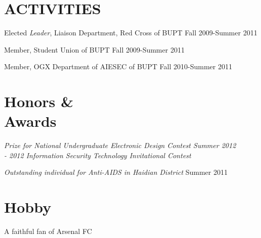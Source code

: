 \documentclass[margin]{res}
\begin{document}
\begin{resume}
    
                                                       
        
\section{ACTIVITIES}             
        Elected {\it Leader}, Liaison Department, Red Cross of BUPT 
        \hfill Fall 2009-Summer 2011
        
        Member, Student Union of BUPT
        \hfill Fall 2009-Summer 2011 
        
        Member, OGX Department of AIESEC of BUPT
        \hfill Fall 2010-Summer 2011
        
                
\section{Honors \& \\ Awards}
        {\sl Prize for National Undergraduate Electronic Design Contest \hfill Summer 2012 
        \\- 2012 Information Security Technology Invitational Contest}
        
        {\sl Outstanding individual for Anti-AIDS in Haidian District}
        \hfill Summer 2011

        
\section{Hobby} A faithful fan of Arsenal FC 

\end{resume}
\end{document}

